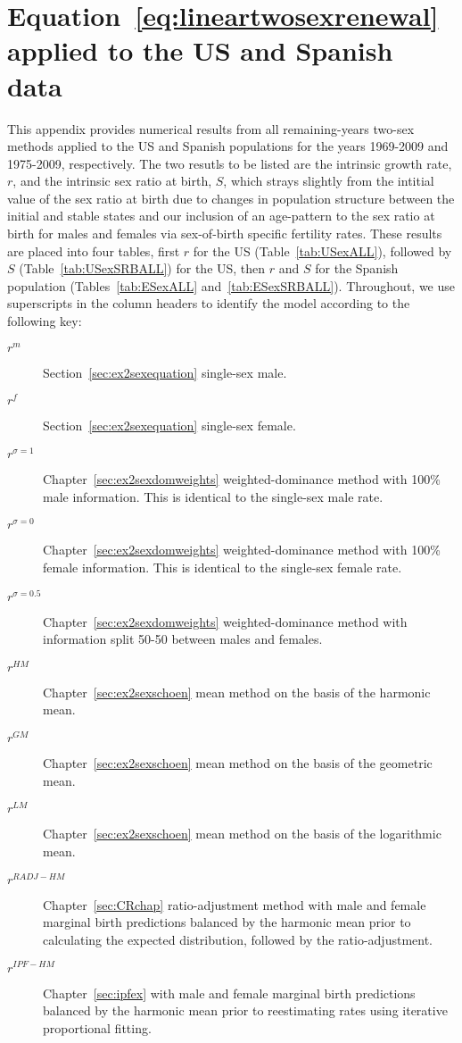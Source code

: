
\chapter{Equation~\ref{eq:lineartwosexrenewal} applied to the US and Spanish
data}
\label{appendix:exallrestimates}

This appendix provides numerical results from all remaining-years two-sex
methods applied to the US and Spanish populations for the years 1969-2009 and
1975-2009, respectively. The two resutls to be listed are the intrinsic growth
rate, $r$, and the intrinsic sex ratio at birth, $S$, which strays slightly from
the intitial value of the sex ratio at birth due to changes in population
structure between the initial and stable states and our inclusion of an
age-pattern to the sex ratio at birth for males and females via sex-of-birth
specific fertility rates. These results are placed into four tables, first $r$
for the US (Table~\ref{tab:USexALL}), followed by $S$
(Table~\ref{tab:USexSRBALL}) for the US, then $r$ and $S$ for the Spanish
population (Tables~\ref{tab:ESexALL} and~\ref{tab:ESexSRBALL}). Throughout, we
use superscripts in the column headers to identify the model according to the following key:
\begin{description}
  \item[$r^m$] Section~\ref{sec:ex2sexequation} single-sex male.
  \item[$r^f$] Section~\ref{sec:ex2sexequation} single-sex female.
  \item[$r^{\sigma=1}$] Chapter~\ref{sec:ex2sexdomweights} weighted-dominance
  method with 100\% male information. This is identical to the single-sex male rate.
  \item[$r^{\sigma=0}$] Chapter~\ref{sec:ex2sexdomweights} weighted-dominance
  method with 100\% female information. This is identical to the single-sex female rate.
  \item[$r^{\sigma=0.5}$] Chapter~\ref{sec:ex2sexdomweights} weighted-dominance
  method with information split 50-50 between males and females.
  \item[$r^{HM}$] Chapter~\ref{sec:ex2sexschoen} mean method on the basis of
  the harmonic mean.
  \item[$r^{GM}$] Chapter~\ref{sec:ex2sexschoen} mean method on the basis of
  the geometric mean.
  \item[$r^{LM}$] Chapter~\ref{sec:ex2sexschoen} mean method on the basis of
  the logarithmic mean.
  \item[$r^{RADJ-HM}$] Chapter~\ref{sec:CRchap} ratio-adjustment method with
  male and female marginal birth predictions balanced by the harmonic mean prior to
  calculating the expected distribution, followed by the ratio-adjustment.
  \item[$r^{IPF-HM}$] Chapter~\ref{sec:ipfex} with male and female marginal
  birth predictions balanced by the harmonic mean prior to reestimating rates
  using iterative proportional fitting.
\end{description}
